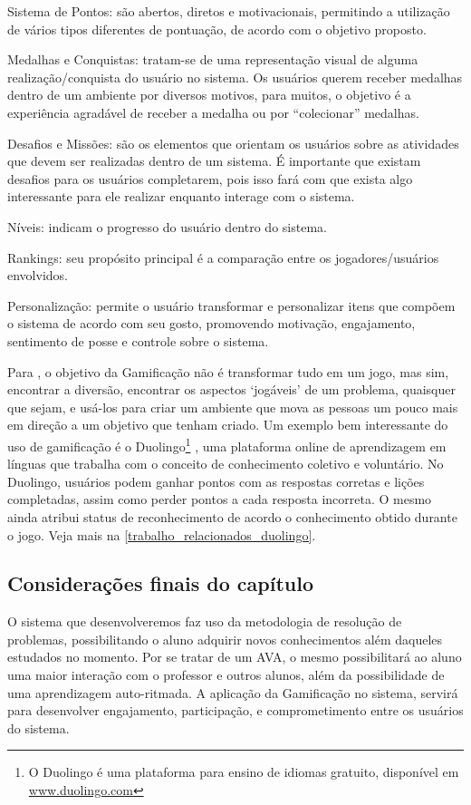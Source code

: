 \begin{alineascomponto}
	\item Sistema de Pontos: são abertos, diretos e motivacionais, permitindo a utilização de vários tipos diferentes de pontuação, de acordo com o objetivo proposto.
	\item Medalhas e Conquistas: tratam-se de uma representação visual de alguma realização/conquista do usuário no sistema. Os usuários querem receber medalhas dentro de um ambiente por diversos 
 motivos, para muitos, o objetivo é a experiência agradável de receber a medalha ou por “colecionar” medalhas.
	\item Desafios e Missões: são os elementos que orientam os usuários sobre as atividades que devem ser realizadas dentro de um sistema. É importante que existam desafios 
para os usuários completarem, pois isso fará com que exista algo interessante para ele realizar enquanto interage com o sistema.
	\item N\'iveis: indicam o progresso do usuário dentro do sistema. 
	\item Rankings: seu propósito principal é a comparação entre os jogadores/usuários envolvidos.
	\item Personalização: permite o usuário transformar e personalizar itens que compõem o sistema de acordo com seu gosto, promovendo motivação, engajamento, sentimento de posse e controle sobre 
o sistema. 
\end{alineascomponto}


Para , o objetivo da Gamificação não é transformar tudo em um jogo, mas sim, encontrar a diversão, encontrar os aspectos `jogáveis' de um problema, quaisquer que 
sejam, e usá-los para criar um ambiente que mova as pessoas um pouco mais em direção a um objetivo que tenham criado. Um exemplo bem interessante do uso de gamificação é o Duolingo\footnote{O 
Duolingo é uma plataforma para ensino de idiomas gratuito, dispon\'ivel em \url{www.duolingo.com} } \cite{von2013duolingo}, uma plataforma online de aprendizagem em línguas que trabalha com o 
conceito de conhecimento coletivo e voluntário. No Duolingo, usuários podem ganhar pontos com as respostas corretas e lições completadas, assim como perder pontos a cada resposta incorreta. O mesmo 
ainda atribui status de reconhecimento de acordo o conhecimento obtido durante o jogo. Veja mais na \autoref{trabalho_relacionados_duolingo}.



\subsection{Considerações finais do cap\'itulo}

O sistema que desenvolveremos faz uso da metodologia de resolução de problemas, possibilitando o aluno adquirir novos conhecimentos além daqueles estudados no momento. Por se tratar de um AVA, 
o mesmo possibilitará ao aluno uma maior interação com o professor e outros alunos, além da possibilidade de uma aprendizagem auto-ritmada. A aplicação da Gamificação no sistema, servir\'a para 
desenvolver  engajamento, participação, e comprometimento entre os usuários do sistema. 